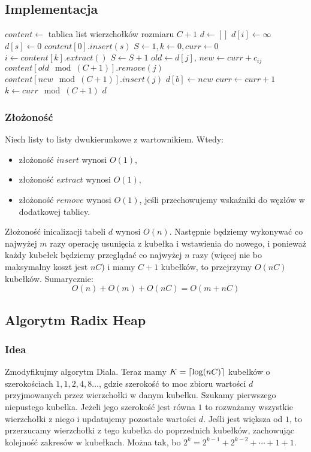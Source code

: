 \documentclass{article}
\DeclarePairedDelimiter\ceil{\lceil}{\rceil}
\begin{document}
\subsection{Implementacja}
\begin{algorithmic}
	\State $content \gets$ tablica list wierzchołków rozmiaru $C+1$
	\State $d \gets []$
		\State $d[i]\gets\infty$
	\EndFor
	\State $d[s] \gets 0$
	\State $content[0].insert(s)$
	\State $S\gets 1, k\gets 0, curr\gets 0$
			\State $i\gets content[k].extract()$
			\State $S\gets S+1$
				\State $old\gets d[j]$,  $new\gets curr+c_{ij}$
						\State $content[old \mod (C+1)].remove(j)$
					\EndIf
					\State $content[new\mod (C+1)].insert(j)$
					\State $d[b] \gets new$
				\EndIf			
			\EndFor
		\EndWhile
			\State $curr\gets curr + 1$
			\State $k \gets curr \mod (C+1)$
	\EndWhile	
	\State \Return $d$
\EndFunction
\end{algorithmic}
\newpage

\subsubsection{Złożoność}
Niech listy to listy dwukierunkowe z wartownikiem. Wtedy:
\begin{itemize}
\item złożoność $insert$ wynosi $O(1)$,
\item złożoność $extract$ wynosi $O(1)$,
\item złożoność $remove$ wynosi $O(1)$, jeśli przechowujemy wskaźniki do węzłów w dodatkowej tablicy.
\end{itemize}
Złożoność inicalizacji tabeli $d$ wynosi $O(n)$. Następnie będziemy wykonywać co najwyżej $m$ razy operację usunięcia z kubełka i wstawienia do nowego, i ponieważ każdy kubełek będziemy przeglądać co najwyżej $n$ razy (więcej nie bo maksymalny koszt jest $nC$) i mamy $C+1$ kubełków, to przejrzymy $O(nC)$ kubełków. Sumarycznie:
$$O(n)+O(m)+O(nC)=O(m+nC)$$




\subsection{Algorytm Radix Heap}
\subsubsection{Idea}
Zmodyfikujmy algorytm Diala. Teraz mamy $K=\ceil{\log(nC)}$ kubełków o szerokościach $1,1,2,4,8\ldots$, gdzie szerokość to moc zbioru wartości $d$ przyjmowanych przez wierzchołki w danym kubełku. Szukamy pierwszego niepustego kubełka. Jeżeli jego szerokość jest równa $1$ to rozważamy wszystkie wierzchołki z niego i updatujemy pozostałe wartości $d$. Jeśli jest większa od $1$, to przerzucamy wierzchołki z tego kubełka do poprzednich kubełków, zachowując kolejność zakresów w kubełkach. Można tak, bo $2^k=2^{k-1}+2^{k-2}+\cdots+1+1$.
\end{document}
